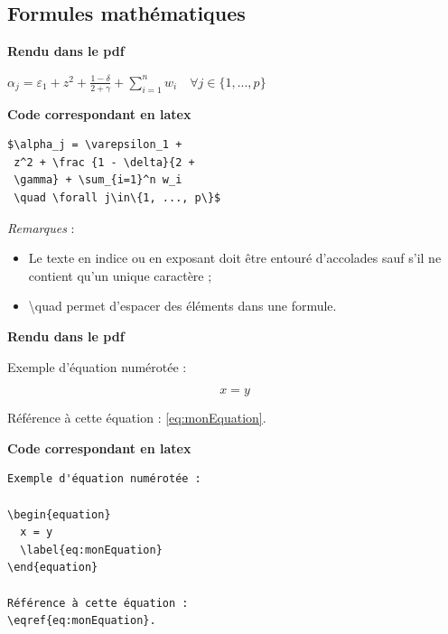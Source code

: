 \documentclass[12pt]{report}
\begin{document}
\subsection{Formules mathématiques}

\begin{minipage}[t]{.45\linewidth}
\textbf{Rendu dans le pdf}
\vspace{.5cm}

  $ \alpha_j  = \varepsilon_1 +  z^2 + \frac  {1 -  \delta}{2 +
    \gamma} + \sum_{i=1}^n w_i\quad \forall j\in\{1, ..., p\}$
\end{minipage}\hfill\vrule\hfill
\begin{minipage}[t]{.45\linewidth}
\textbf{Code correspondant en latex}

\begin{verbatim}
$\alpha_j = \varepsilon_1 + 
 z^2 + \frac {1 - \delta}{2 +
 \gamma} + \sum_{i=1}^n w_i
 \quad \forall j\in\{1, ..., p\}$
\end{verbatim}
\end{minipage}


\textit{Remarques} :
\begin{itemize}
\item Le texte en indice ou en exposant doit être entouré
  d'accolades sauf s'il ne contient qu'un unique caractère ;
\item \textbackslash quad permet d'espacer des éléments dans une formule.
\end{itemize}
\vspace{.3cm}

\begin{minipage}[t]{.45\linewidth}
\textbf{Rendu dans le pdf}
\vspace{.5cm}

Exemple d'équation numérotée :

\begin{equation}
  x = y
  \label{eq:monEquation}
\end{equation}

Référence à cette équation : \eqref{eq:monEquation}.
\end{minipage}\hfill\vrule\hfill
\begin{minipage}[t]{.45\linewidth}
\textbf{Code correspondant en latex}

\begin{verbatim}
Exemple d'équation numérotée :

\begin{equation}
  x = y
  \label{eq:monEquation}
\end{equation}

Référence à cette équation : 
\eqref{eq:monEquation}.
\end{verbatim}

\end{minipage}
\end{document}

